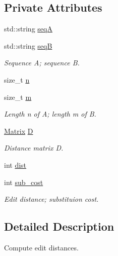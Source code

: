 \subsection*{Private Attributes}
\begin{DoxyCompactItemize}
\item 
std\+::string \hyperlink{class_edit_distance_abdf167c583e1e7e8a205337aa03a03a0}{seq\+A}
\item 
std\+::string \hyperlink{class_edit_distance_a143b5f60e454356f78a4d57ddcb1601c}{seq\+B}
\begin{DoxyCompactList}\small\item\em Sequence A; sequence B. \end{DoxyCompactList}\item 
size\+\_\+t \hyperlink{class_edit_distance_a780d72a3f2627b83117412f5a0c90e3f}{n}
\item 
size\+\_\+t \hyperlink{class_edit_distance_a972107b21315045b5ae82338d16ab8dd}{m}
\begin{DoxyCompactList}\small\item\em Length n of A; length m of B. \end{DoxyCompactList}\item 
\hyperlink{edit__distance_8hpp_a0eb1dc942afe714c426a46f6ca30b86d}{Matrix} \hyperlink{class_edit_distance_a8a19bcc0fd8e09a7893b8b3e1552e481}{D}
\begin{DoxyCompactList}\small\item\em Distance matrix D. \end{DoxyCompactList}\item 
int \hyperlink{class_edit_distance_ad170899fef1703a5ad53ea24203d2cca}{dist}
\item 
int \hyperlink{class_edit_distance_a8d220afccf33fade211f6152651f7f27}{sub\+\_\+cost}
\begin{DoxyCompactList}\small\item\em Edit distance; substituion cost. \end{DoxyCompactList}\end{DoxyCompactItemize}


\subsection{Detailed Description}
Compute edit distances. 

